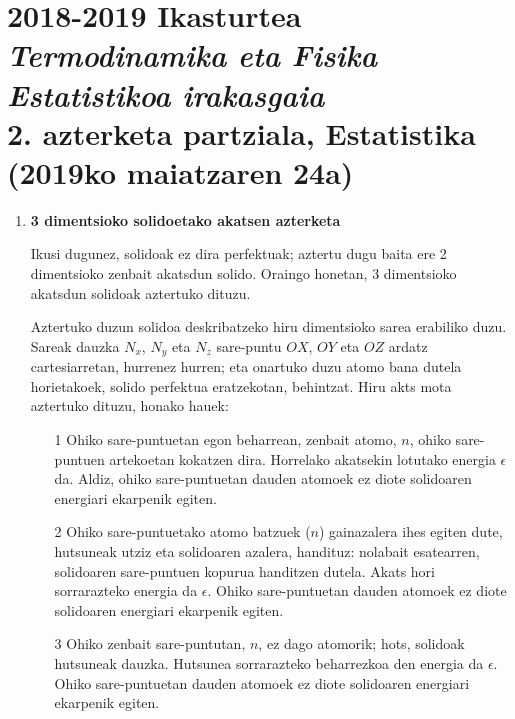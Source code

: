 \documentclass[10pt]{article}              %
\begin{document}




\section*{2018-2019 Ikasturtea\\
\textit{Termodinamika eta Fisika Estatistikoa irakasgaia}\\
2. azterketa partziala, Estatistika\\
(2019ko maiatzaren 24a)}

\vspace{0.25cm}


\begin{enumerate}


\item {\bf{3 dimentsioko solidoetako akatsen azterketa}} 

\item[] Ikusi dugunez, solidoak ez dira perfektuak; aztertu dugu baita ere 2 dimentsioko zenbait akatsdun solido. Oraingo honetan, 3 dimentsioko akatsdun solidoak aztertuko dituzu. 

Aztertuko duzun solidoa deskribatzeko hiru dimentsioko sarea erabiliko duzu. Sareak dauzka $N_{x}$, $N_{y}$ eta $N_{z}$ sare-puntu $OX$, $OY$ eta $OZ$ ardatz cartesiarretan, hurrenez hurren; eta onartuko duzu atomo bana dutela horietakoek, solido perfektua eratzekotan, behintzat. Hiru akts mota aztertuko dituzu, honako hauek:
 
\begin{enumerate}
	\item[1] Ohiko sare-puntuetan egon beharrean, zenbait atomo, $n$, ohiko sare-puntuen artekoetan kokatzen dira. Horrelako akatsekin lotutako energia $\epsilon$ da. Aldiz, ohiko sare-puntuetan dauden atomoek ez diote solidoaren energiari ekarpenik egiten.  	
	\item[2] Ohiko sare-puntuetako atomo batzuek ($n$) gainazalera ihes egiten dute, hutsuneak utziz eta solidoaren azalera, handituz: nolabait esatearren, solidoaren sare-puntuen kopurua handitzen dutela. Akats hori sorrarazteko energia da $\epsilon$. Ohiko sare-puntuetan dauden atomoek ez diote solidoaren energiari ekarpenik egiten.
	\item[3] Ohiko zenbait sare-puntutan, $n$, ez dago atomorik; hots, solidoak hutsuneak dauzka. Hutsunea sorrarazteko beharrezkoa den energia da $\epsilon$. Ohiko sare-puntuetan dauden atomoek ez diote solidoaren energiari ekarpenik egiten.
\end{enumerate}


\end{enumerate}
\end{document}
